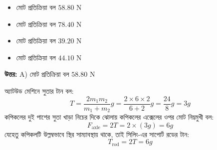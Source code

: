 \documentclass[12pt, a4paper]{article}
\begin{document}
{\begin{center}
\end{center}
\vspace{1em}

\begin{itemize}[label={}, leftmargin=1cm, itemsep=0.5em]
\item[\textbf{A)}] মোট প্রতিক্রিয়া বল $58.80\text{ N}$
\item[\textbf{B)}] মোট প্রতিক্রিয়া বল $78.40\text{ N}$
\item[\textbf{C)}] মোট প্রতিক্রিয়া বল $39.20\text{ N}$
\item[\textbf{D)}] মোট প্রতিক্রিয়া বল $44.10\text{ N}$
\end{itemize}

\vspace{0.5em}
\begin{tcolorbox}[answerbox]
\textbf{\color{success} উত্তর:} A) মোট প্রতিক্রিয়া বল $58.80\text{ N}$
\end{tcolorbox}
\vspace{1em}

\begin{tcolorbox}[solutionbox={সমাধান (Solution)}]
\noindent
অ্যাটউড মেশিনে সুতার টান বল:
\[ T = \frac{2 m_1 m_2}{m_1 + m_2} g = \frac{2 \times 6 \times 2}{6 + 2} g = \frac{24}{8} g = 3 g \]
কপিকলের দুই পাশের সুতা খাড়া নিচের দিকে ঝোলায় কপিকলের এক্সেলের ওপর মোট নিম্নমুখী বল:
\[ F_{\text{axle}} = 2 T = 2 \times (3 g) = 6 g \]
যেহেতু কপিকলটি উল্লম্বভাবে স্থির সাম্যাবস্থায় থাকে, তাই সিলিং-এর সাপোর্ট রডের টান:
\[ T_{\text{rod}} = 2T = 6 g \]


\end{tcolorbox}}
\end{document}
